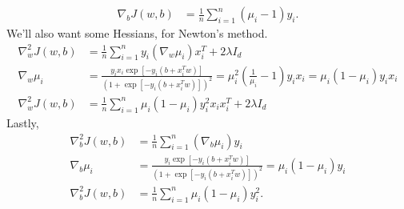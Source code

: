\documentclass[11pt,letterpaper]{article}
\numberwithin{equation}{section}
\numberwithin{figure}{section}
\begin{document}
\begin{enumerate}
\begin{enumerate}
\begin{align*}
			\nabla_b J(w,b) &= \frac{1}{n} \sum_{i=1}^n (\mu_i -1) y_i.
		\end{align*}
		We'll also want some Hessians, for Newton's method.
		\begin{align*}
			\nabla^2_w J(w,b) &= \frac{1}{n} \sum_{i=1}^n y_i (\nabla_w \mu_i) x_i^T + 2\lambda I_d\\
			\nabla_w \mu_i &= \frac{y_i x_i \exp\left[-y_i(b+x_i^T w)\right]}{\left(1+\exp\left[-y_i(b+x_i^T w)\right]\right)^2} = \mu_i^2 \left(\frac{1}{\mu_i} - 1\right) y_i x_i = \mu_i (1- \mu_i) y_i x_i\\
			\nabla^2_w J(w,b) &= \frac{1}{n} \sum_{i=1}^n \mu_i (1-\mu_i) y_i^2 x_i x_i^T + 2 \lambda I_d
		\end{align*}
		Lastly,
		\begin{align*}
			\nabla^2_b J(w,b) &= \frac{1}{n} \sum_{i=1}^n (\nabla_b \mu_i) y_i\\
			\nabla_b \mu_i &= \frac{y_i \exp\left[-y_i(b+x_i^T w)\right]}{\left(1+\exp\left[-y_i(b+x_i^T w)\right]\right)^2} = \mu_i(1-\mu_i)y_i\\
			\nabla^2_b J(w,b) &= \frac{1}{n} \sum_{i=1}^n \mu_i(1-\mu_i) y_i^2.
		\end{align*}
	\end{enumerate}
\end{enumerate}
\end{document}
